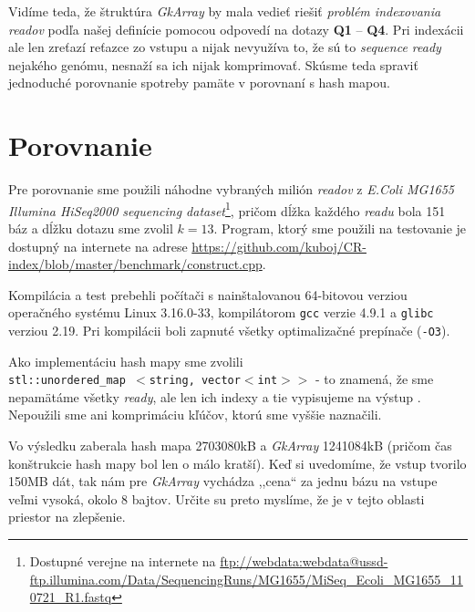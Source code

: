 Vidíme teda, že štruktúra \emph{GkArray} by mala vedieť riešiť \emph{problém indexovania readov} podľa našej definície pomocou odpovedí na dotazy \textbf{Q1} -- \textbf{Q4}. Pri indexácii ale len zreťazí reťazce zo vstupu a nijak nevyužíva to, že sú to \emph{sequence ready} nejakého genómu, nesnaží sa ich nijak komprimovať. Skúsme teda spraviť jednoduché porovnanie spotreby pamäte v porovnaní s hash mapou.

\section{Porovnanie}
Pre porovnanie sme použili náhodne vybraných milión \emph{readov} z \emph{E.Coli MG1655 Illumina HiSeq2000 sequencing dataset}\footnote{Dostupné verejne na internete na \url{ftp://webdata:webdata@ussd-ftp.illumina.com/Data/SequencingRuns/MG1655/MiSeq\_Ecoli\_MG1655\_110721\_R1.fastq}}, pričom dĺžka každého \emph{readu} bola 151 báz a dĺžku dotazu sme zvolil $k=13$. Program, ktorý sme použili na testovanie je dostupný na internete na adrese \url{https://github.com/kuboj/CR-index/blob/master/benchmark/construct.cpp}.

Kompilácia a test prebehli počítači s nainštalovanou 64-bitovou verziou operačného systému Linux 3.16.0-33, kompilátorom \texttt{gcc} verzie 4.9.1 a \texttt{glibc} verziou 2.19. Pri kompilácii boli zapnuté všetky optimalizačné prepínače (\texttt{-O3}).

Ako implementáciu hash mapy sme zvolili \\ \texttt{stl::unordered\_map $<$string, vector$<$int$>>$} - to znamená, že sme nepamätáme všetky \emph{ready}, ale len ich indexy a tie vypisujeme na výstup . Nepoužili sme ani komprimáciu kľúčov, ktorú sme vyššie naznačili.

Vo výsledku zaberala hash mapa 2703080kB a \emph{GkArray} 1241084kB (pričom čas konštrukcie hash mapy bol len o málo kratší). Keď si uvedomíme, že vstup tvorilo 150MB dát, tak nám pre \emph{GkArray} vychádza ,,cena`` za jednu bázu na vstupe veľmi vysoká, okolo 8 bajtov. Určite su preto myslíme, že je v tejto oblasti priestor na zlepšenie.
